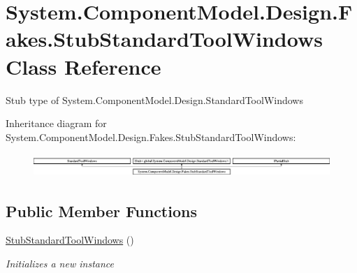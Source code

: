 \hypertarget{class_system_1_1_component_model_1_1_design_1_1_fakes_1_1_stub_standard_tool_windows}{\section{System.\-Component\-Model.\-Design.\-Fakes.\-Stub\-Standard\-Tool\-Windows Class Reference}
\label{class_system_1_1_component_model_1_1_design_1_1_fakes_1_1_stub_standard_tool_windows}
}


Stub type of System.\-Component\-Model.\-Design.\-Standard\-Tool\-Windows 


Inheritance diagram for System.\-Component\-Model.\-Design.\-Fakes.\-Stub\-Standard\-Tool\-Windows\-:\begin{figure}[H]
\begin{center}
\leavevmode
\includegraphics[height=0.880503cm]{class_system_1_1_component_model_1_1_design_1_1_fakes_1_1_stub_standard_tool_windows}
\end{center}
\end{figure}
\subsection*{Public Member Functions}
\begin{DoxyCompactItemize}
\item 
\hyperlink{class_system_1_1_component_model_1_1_design_1_1_fakes_1_1_stub_standard_tool_windows_a2771d2efd2772468b17ddd197e22b484}{Stub\-Standard\-Tool\-Windows} ()
\begin{DoxyCompactList}\small\item\em Initializes a new instance\end{DoxyCompactList}\end{DoxyCompactItemize}
